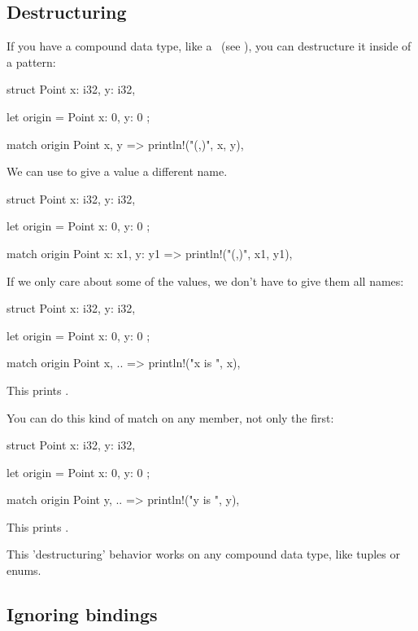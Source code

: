 \subsection*{Destructuring}

If you have a compound data type, like a \struct\ (see ), you can destructure it inside of a pattern:

\begin{rustc}
struct Point {
    x: i32,
    y: i32,
}

let origin = Point { x: 0, y: 0 };

match origin {
    Point { x, y } => println!("({},{})", x, y),
}
\end{rustc}

We can use \code{:} to give a value a different name.

\begin{rustc}
struct Point {
    x: i32,
    y: i32,
}

let origin = Point { x: 0, y: 0 };

match origin {
    Point { x: x1, y: y1 } => println!("({},{})", x1, y1),
}
\end{rustc}

If we only care about some of the values, we don't have to give them all names:

\begin{rustc}
struct Point {
    x: i32,
    y: i32,
}

let origin = Point { x: 0, y: 0 };

match origin {
    Point { x, .. } => println!("x is {}", x),
}
\end{rustc}

This prints .

You can do this kind of match on any member, not only the first:

\begin{rustc}
struct Point {
    x: i32,
    y: i32,
}

let origin = Point { x: 0, y: 0 };

match origin {
    Point { y, .. } => println!("y is {}", y),
}
\end{rustc}

This prints .

\blank

This 'destructuring' behavior works on any compound data type, like tuples or enums.

\subsection*{Ignoring bindings}

